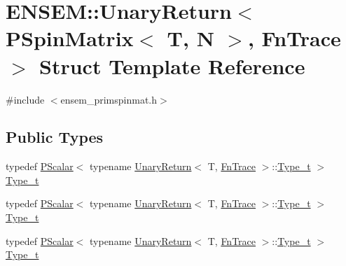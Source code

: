 \hypertarget{structENSEM_1_1UnaryReturn_3_01PSpinMatrix_3_01T_00_01N_01_4_00_01FnTrace_01_4}{}\section{E\+N\+S\+EM\+:\+:Unary\+Return$<$ P\+Spin\+Matrix$<$ T, N $>$, Fn\+Trace $>$ Struct Template Reference}
\label{structENSEM_1_1UnaryReturn_3_01PSpinMatrix_3_01T_00_01N_01_4_00_01FnTrace_01_4}


{\ttfamily \#include $<$ensem\+\_\+primspinmat.\+h$>$}

\subsection*{Public Types}
\begin{DoxyCompactItemize}
\item 
typedef \mbox{\hyperlink{classENSEM_1_1PScalar}{P\+Scalar}}$<$ typename \mbox{\hyperlink{structENSEM_1_1UnaryReturn}{Unary\+Return}}$<$ T, \mbox{\hyperlink{structENSEM_1_1FnTrace}{Fn\+Trace}} $>$\+::\mbox{\hyperlink{structENSEM_1_1UnaryReturn_3_01PSpinMatrix_3_01T_00_01N_01_4_00_01FnTrace_01_4_a63cfdcd3d97470a7ba1f1a5108db767d}{Type\+\_\+t}} $>$ \mbox{\hyperlink{structENSEM_1_1UnaryReturn_3_01PSpinMatrix_3_01T_00_01N_01_4_00_01FnTrace_01_4_a63cfdcd3d97470a7ba1f1a5108db767d}{Type\+\_\+t}}
\item 
typedef \mbox{\hyperlink{classENSEM_1_1PScalar}{P\+Scalar}}$<$ typename \mbox{\hyperlink{structENSEM_1_1UnaryReturn}{Unary\+Return}}$<$ T, \mbox{\hyperlink{structENSEM_1_1FnTrace}{Fn\+Trace}} $>$\+::\mbox{\hyperlink{structENSEM_1_1UnaryReturn_3_01PSpinMatrix_3_01T_00_01N_01_4_00_01FnTrace_01_4_a63cfdcd3d97470a7ba1f1a5108db767d}{Type\+\_\+t}} $>$ \mbox{\hyperlink{structENSEM_1_1UnaryReturn_3_01PSpinMatrix_3_01T_00_01N_01_4_00_01FnTrace_01_4_a63cfdcd3d97470a7ba1f1a5108db767d}{Type\+\_\+t}}
\item 
typedef \mbox{\hyperlink{classENSEM_1_1PScalar}{P\+Scalar}}$<$ typename \mbox{\hyperlink{structENSEM_1_1UnaryReturn}{Unary\+Return}}$<$ T, \mbox{\hyperlink{structENSEM_1_1FnTrace}{Fn\+Trace}} $>$\+::\mbox{\hyperlink{structENSEM_1_1UnaryReturn_3_01PSpinMatrix_3_01T_00_01N_01_4_00_01FnTrace_01_4_a63cfdcd3d97470a7ba1f1a5108db767d}{Type\+\_\+t}} $>$ \mbox{\hyperlink{structENSEM_1_1UnaryReturn_3_01PSpinMatrix_3_01T_00_01N_01_4_00_01FnTrace_01_4_a63cfdcd3d97470a7ba1f1a5108db767d}{Type\+\_\+t}}
\end{DoxyCompactItemize}


